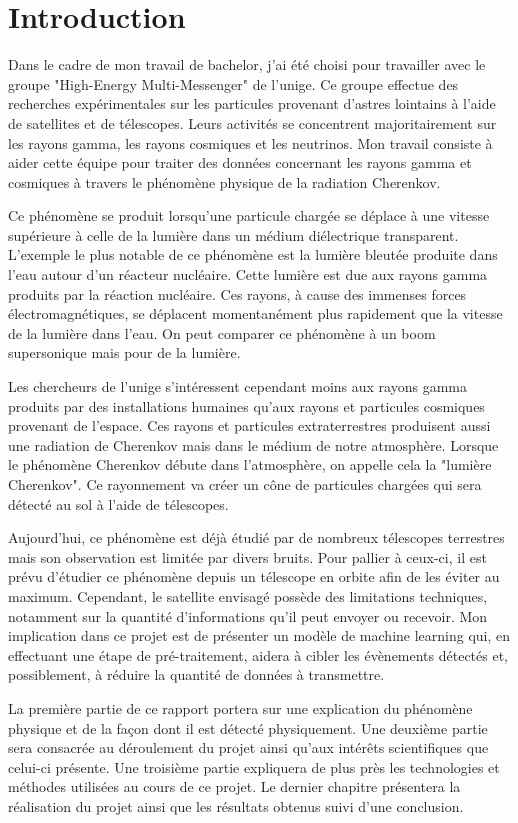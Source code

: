 \chapter*{Introduction}

Dans le cadre de mon travail de bachelor, j'ai été choisi pour travailler avec le groupe "High-Energy Multi-Messenger" de l'\gls{unige}.
Ce groupe effectue des recherches expérimentales sur les particules provenant d'astres lointains à l'aide de satellites et de télescopes.
Leurs activités se concentrent majoritairement sur les rayons gamma, les rayons cosmiques et les neutrinos.
Mon travail consiste à aider cette équipe pour traiter des données concernant les rayons gamma et cosmiques à travers le phénomène physique de la radiation Cherenkov. 

Ce phénomène se produit lorsqu'une particule chargée se déplace à une vitesse supérieure à celle de la lumière dans un médium diélectrique transparent. 
L'exemple le plus notable de ce phénomène est la lumière bleutée produite dans l'eau autour d'un réacteur nucléaire. 
Cette lumière est due aux rayons gamma produits par la réaction nucléaire. Ces rayons, à cause des immenses forces électromagnétiques, se déplacent momentanément plus 
rapidement que la vitesse de la lumière dans l'eau.
On peut comparer ce phénomène à un boom supersonique mais pour de la lumière.

Les chercheurs de l'\gls{unige} s'intéressent cependant moins aux rayons gamma produits par des installations humaines qu'aux rayons et particules cosmiques provenant de l'espace.
Ces rayons et particules extraterrestres produisent aussi une radiation de Cherenkov mais dans le médium de notre atmosphère.
Lorsque le phénomène Cherenkov débute dans l'atmosphère, on appelle cela la "lumière Cherenkov".
Ce rayonnement va créer un cône de particules chargées qui sera détecté au sol à l'aide de télescopes. 

Aujourd'hui, ce phénomène est déjà étudié par de nombreux télescopes terrestres mais son observation est limitée par
divers bruits. Pour pallier à ceux-ci, il est prévu d'étudier ce phénomène depuis un télescope en orbite afin de les éviter au maximum.
Cependant, le satellite envisagé possède des limitations techniques, notamment sur la quantité d'informations qu'il peut envoyer ou recevoir.
Mon implication dans ce projet est de présenter un modèle de machine learning qui, en effectuant une étape de pré-traitement, aidera à cibler les
évènements détectés et, possiblement, à réduire la quantité de données à transmettre.

La première partie de ce rapport portera sur une explication du phénomène physique et de la façon dont il est détecté physiquement.
Une deuxième partie sera consacrée au déroulement du projet ainsi qu'aux intérêts scientifiques que celui-ci présente.
Une troisième partie expliquera de plus près les technologies et méthodes utilisées au cours de ce projet.
Le dernier chapitre présentera la réalisation du projet ainsi que les résultats obtenus suivi d'une conclusion.
